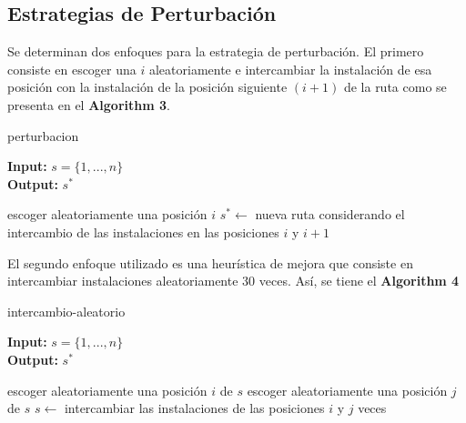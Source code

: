 \documentclass[11pt]{article}
\begin{document}
\subsection{Estrategias de Perturbación}
Se determinan dos enfoques para la estrategia de perturbación. El primero consiste en escoger una
 $i$ aleatoriamente e intercambiar la instalación de esa posición con la instalación de la posición siguiente
$(i + 1)$ de la ruta como se presenta en el \textbf{Algorithm 3}.

\begin{algorithm}[H]
    \caption{perturbacion}
    \label{NN}
    \hspace*{} \textbf{Input:} $s=\{1, . . . , n\}$ \\
    \hspace*{} \textbf{Output:} $s^*$
    \begin{algorithmic}[1]
    \State escoger aleatoriamente una posición $i$
    \State $s^*  \gets $ nueva ruta considerando el intercambio de las instalaciones en las posiciones $i$ y $i+1$
   \end{algorithmic}
\end{algorithm}    

\newpage
El segundo enfoque utilizado es una heurística de mejora que consiste en intercambiar instalaciones
aleatoriamente 30 veces. Así, se tiene el  \textbf{Algorithm 4}

\begin{algorithm}[H]
    \caption{intercambio-aleatorio}
    \label{NN}
    \hspace*{} \textbf{Input:} $s=\{1, . . . , n\}$ \\
    \hspace*{} \textbf{Output:} $s^*$
    \begin{algorithmic}[1]
    \Repeat
        \State escoger aleatoriamente una posición $i$ de $s$
        \State escoger aleatoriamente una posición $j$ de $s$
        \State $s  \gets $ intercambiar las instalaciones de las posiciones $i$ y $j$
     veces
   \end{algorithmic}
\end{algorithm}    
\end{document}
